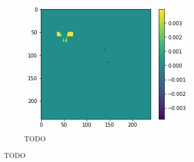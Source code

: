 \begin{figure}[H]
\begin{subfigure}[t]{.33\textwidth}
        \centering
        \includegraphics[width=\linewidth]{chapters/06_hdm/images_analyze/0c_diff.png}
        \caption{TODO}
    \end{subfigure}
    \caption{TODO}
\end{figure}

